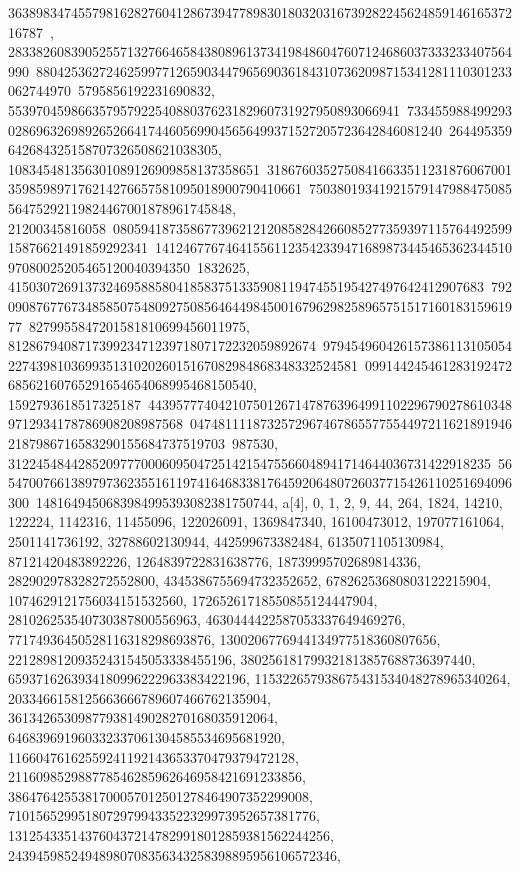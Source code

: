 {{{36389834745579816282760412867394778983018032031673928224562485914616537216787\
, 283382608390525571327664658438089613734198486047607124686037333233407564990\
88042536272462599771265903447965690361843107362098715341281110301233062744970\
5795856192231690832, 55397045986635795792254088037623182960731927950893066941\
73345598849929302869632698926526641744605699045656499371527205723642846081240\
264495359642684325158707326508621038305, 108345481356301089126909858137358651\
31867603527508416633511231876067001359859897176214276657581095018900790410661\
7503801934192157914798847508556475292119824467001878961745848, 21200345816058\
08059418735867739621212085828426608527735939711576449259915876621491859292341\
14124677674641556112354233947168987344546536234451097080025205465120040394350\
1832625, 41503072691373246958858041858375133590811947455195427497642412907683\
79209087677673485850754809275085646449845001679629825896575151716018315961977\
8279955847201581810699456011975, 81286794087173992347123971807172232059892674\
97945496042615738611310505422743981036993513102026015167082984868348332524581\
09914424546128319247268562160765291654654068995468150540, 1592793618517325187\
44395777404210750126714787639649911022967902786103489712934178786908208987568\
04748111187325729674678655775544972116218919462187986716583290155684737519703\
987530, 312245484428520977700060950472514215475566048941714644036731422918235\
56547007661389797362355161197416468338176459206480726037715426110251694096300\
1481649450683984995393082381750744}}, 
 {a[4], {0, 1, 2, 9, 44, 264, 1824, 14210, 122224, 1142316, 11455096, 
   122026091, 1369847340, 16100473012, 197077161064, 2501141736192, 
   32788602130944, 442599673382484, 6135071105130984, 87121420483892226, 
   1264839722831638776, 18739995702689814336, 282902978328272552800, 
   4345386755694732352652, 67826253680803122215904, 
   1074629121756034151532560, 17265261718550855124447904, 
   281026253540730387800556963, 4630444422587053337649469276, 
   77174936450528116318298693876, 1300206776944134977518360807656, 
   22128981209352431545053338455196, 380256181799321813857688736397440, 
   6593716263934180996222963383422196, 115322657938675431534048278965340264, 
   2033466158125663666789607466762135904, 
   36134265309877938149028270168035912064, 
   646839691960332337061304585534695681920, 
   11660476162559241192143653370479379472128, 
   211609852988778546285962646958421691233856, 
   3864764255381700057012501278464907352299008, 
   71015652995180729799433522329973952657381776, 
   1312543351437604372147829918012859381562244256, 
   24394598524948980708356343258398895956106572346, 
}}}
